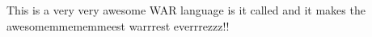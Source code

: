 
This is a very very awesome WAR language is it called and it makes the awesomemmememmeest warrrest everrrezzz!!